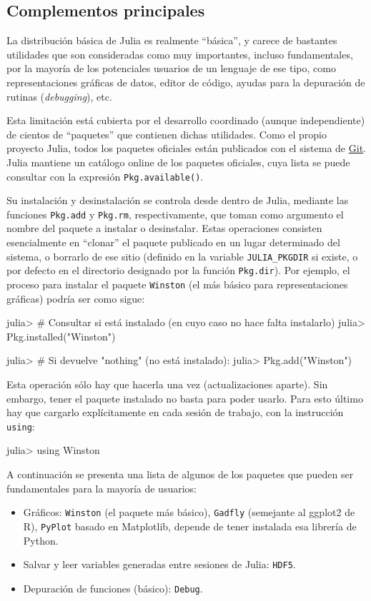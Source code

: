 ﻿\documentclass{article}
\newcommand{\code}{\texttt}
\begin{document}
\subsection{Complementos principales}

La distribución básica de Julia es realmente ``básica'', y carece de bastantes utilidades que son consideradas como muy importantes, incluso fundamentales, por la mayoría de los potenciales usuarios de un lenguaje de ese tipo, como representaciones gráficas de datos, editor de código, ayudas para la depuración de rutinas (\emph{debugging}), etc.

Esta limitación está cubierta por el desarrollo coordinado (aunque independiente) de cientos de ``paquetes'' que contienen dichas utilidades. Como el propio proyecto Julia, todos los paquetes oficiales están publicados con el sistema de \href{http://git-scm.com/}{Git}. Julia mantiene un catálogo online de los paquetes oficiales, cuya lista se puede consultar con la expresión \code{Pkg.available()}.

Su instalación y desinstalación se controla desde dentro de Julia, mediante las funciones \code{Pkg.add} y \code{Pkg.rm}, respectivamente, que toman como argumento el nombre del paquete a instalar o desinstalar. Estas operaciones consisten esencialmente en ``clonar'' el paquete publicado en un lugar determinado del sistema, o borrarlo de ese sitio (definido en la variable \code{JULIA_PKGDIR} si existe, o por defecto en el directorio designado por la función \code{Pkg.dir}). Por ejemplo, el proceso para instalar el paquete \code{Winston} (el más básico para representaciones gráficas) podría ser como sigue:

julia> # Consultar si está instalado (en cuyo caso no hace falta instalarlo)
julia> Pkg.installed("Winston")

julia> # Si devuelve "nothing" (no está instalado):
julia> Pkg.add("Winston")

Esta operación sólo hay que hacerla una vez (actualizaciones aparte). Sin embargo, tener el paquete instalado no basta para poder usarlo. Para esto último hay que cargarlo explícitamente en cada sesión de trabajo, con la instrucción \code{using}:

julia> using Winston

A continuación se presenta una lista de algunos de los paquetes que pueden ser fundamentales para la mayoría de usuarios:

\begin{itemize}
  \item Gráficos: \texttt{Winston} (el paquete más básico), \texttt{Gadfly} (semejante al ggplot2 de R), \texttt{PyPlot} basado en Matplotlib, depende de tener instalada esa librería de Python.
  \item Salvar y leer variables generadas entre sesiones de Julia: \texttt{HDF5}.
  \item Depuración de funciones (básico): \texttt{Debug}.
\end{itemize}
\end{document}

